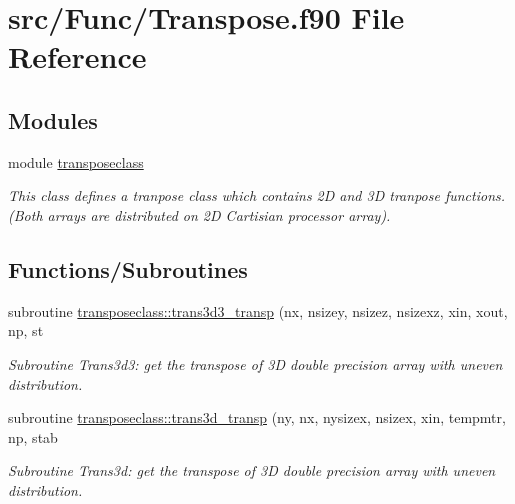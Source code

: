 \hypertarget{_transpose_8f90}{}\section{src/\+Func/\+Transpose.f90 File Reference}
\label{_transpose_8f90}
\subsection*{Modules}
\begin{DoxyCompactItemize}
\item 
module \mbox{\hyperlink{namespacetransposeclass}{transposeclass}}
\begin{DoxyCompactList}\small\item\em This class defines a tranpose class which contains 2D and 3D tranpose functions. (Both arrays are distributed on 2D Cartisian processor array). \end{DoxyCompactList}\end{DoxyCompactItemize}
\subsection*{Functions/\+Subroutines}
\begin{DoxyCompactItemize}
\item 
subroutine \mbox{\hyperlink{namespacetransposeclass_ac2cdff8d4fbeb19df8a8ba2ff562b8c2}{transposeclass\+::trans3d3\+\_\+transp}} (nx, nsizey, nsizez, nsizexz, xin, xout, np, st
\begin{DoxyCompactList}\small\item\em Subroutine Trans3d3\+: get the transpose of 3D double precision array with uneven distribution. \end{DoxyCompactList}\item 
subroutine \mbox{\hyperlink{namespacetransposeclass_a53eeae5e11acd8c39e03fb8672f2d90e}{transposeclass\+::trans3d\+\_\+transp}} (ny, nx, nysizex, nsizex, xin, tempmtr, np, stab
\begin{DoxyCompactList}\small\item\em Subroutine Trans3d\+: get the transpose of 3D double precision array with uneven distribution. \end{DoxyCompactList}\end{DoxyCompactItemize}
